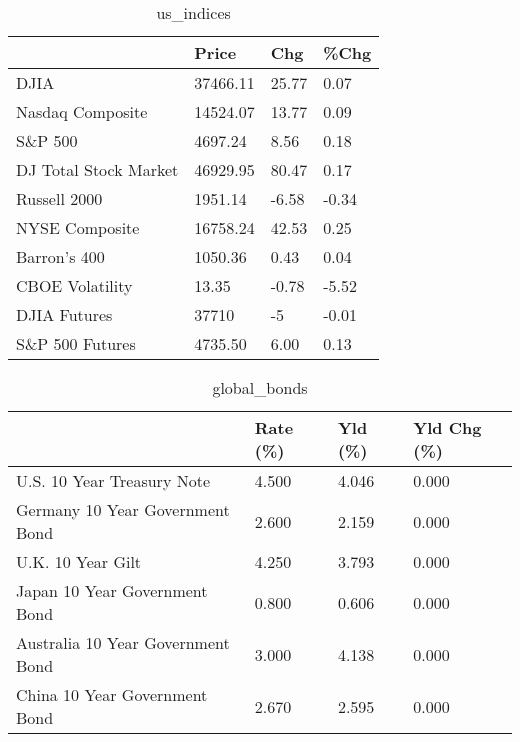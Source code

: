 \documentclass{article}%
\begin{document}
%


\begin{table}[htbp]%
\caption{us\_indices}%
\centering%
\begin{adjustbox}{width=1\textwidth}%
\begin{tabular}{llll}
\toprule
                      &    Price &   Chg &  \%Chg \\
\midrule
                 DJIA & 37466.11 & 25.77 &  0.07 \\
     Nasdaq Composite & 14524.07 & 13.77 &  0.09 \\
              S\&P 500 &  4697.24 &  8.56 &  0.18 \\
DJ Total Stock Market & 46929.95 & 80.47 &  0.17 \\
         Russell 2000 &  1951.14 & -6.58 & -0.34 \\
       NYSE Composite & 16758.24 & 42.53 &  0.25 \\
         Barron's 400 &  1050.36 &  0.43 &  0.04 \\
      CBOE Volatility &    13.35 & -0.78 & -5.52 \\
         DJIA Futures &    37710 &    -5 & -0.01 \\
      S\&P 500 Futures &  4735.50 &  6.00 &  0.13 \\
\bottomrule
\end{tabular}
%
\end{adjustbox}%
\end{table}

%


\begin{table}[htbp]%
\caption{global\_bonds}%
\centering%
\begin{adjustbox}{width=1\textwidth}%
\begin{tabular}{llll}
\toprule
                                  & Rate (\%) & Yld (\%) & Yld Chg (\%) \\
\midrule
       U.S. 10 Year Treasury Note &    4.500 &   4.046 &       0.000 \\
  Germany 10 Year Government Bond &    2.600 &   2.159 &       0.000 \\
                U.K. 10 Year Gilt &    4.250 &   3.793 &       0.000 \\
    Japan 10 Year Government Bond &    0.800 &   0.606 &       0.000 \\
Australia 10 Year Government Bond &    3.000 &   4.138 &       0.000 \\
    China 10 Year Government Bond &    2.670 &   2.595 &       0.000 \\
\bottomrule
\end{tabular}
%
\end{adjustbox}%
\end{table}
\end{document}
